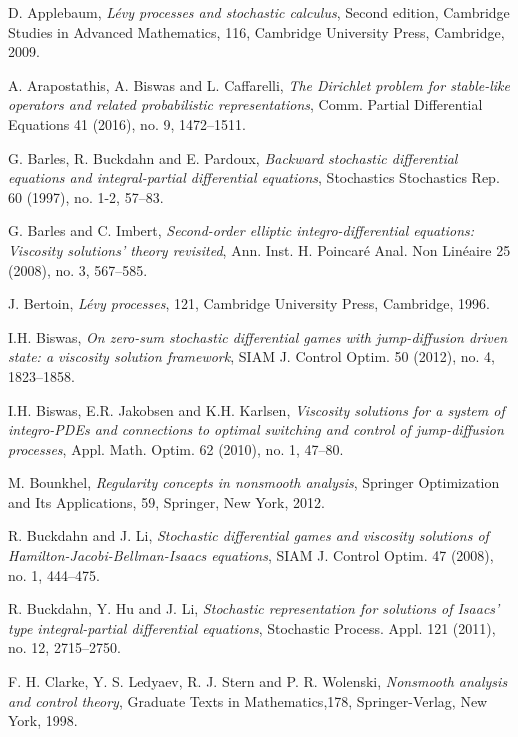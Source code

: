 \documentclass[amscd,amssymb,11pt]{article}
\numberwithin{theorem}{section}
\numberwithin{equation}{section}
\begin{document}
\begin{thebibliography}{99}

 D. Applebaum, {\it L\'evy processes and stochastic calculus}, Second edition,
Cambridge Studies in Advanced Mathematics, 116, Cambridge University Press, Cambridge, 2009.

A. Arapostathis, A. Biswas and L. Caffarelli, {\it The Dirichlet problem for stable-like operators and related probabilistic representations}, Comm. Partial Differential Equations 41 (2016), no. 9, 1472--1511.

 G. Barles, R. Buckdahn and E. Pardoux, {\it Backward stochastic differential equations and
integral-partial differential equations}, Stochastics Stochastics Rep. 60 (1997), no. 1-2, 57--83.

  G. Barles and C. Imbert, {\it Second-order elliptic integro-differential equations: Viscosity solutions'
theory revisited}, Ann. Inst. H. Poincar\'e Anal. Non Lin\'eaire 25 (2008), no. 3, 567--585.

 J. Bertoin, {\it L\'evy processes}, 121, Cambridge University Press, Cambridge, 1996.

 I.H. Biswas, {\it On zero-sum stochastic differential games with jump-diffusion driven state:
a viscosity solution framework}, SIAM J. Control Optim. 50 (2012), no. 4, 1823--1858.

 I.H. Biswas, E.R. Jakobsen and K.H. Karlsen,
{\it Viscosity solutions for a system of integro-PDEs and connections to optimal switching and control of jump-diffusion processes},
Appl. Math. Optim. 62 (2010), no. 1, 47--80.

 M. Bounkhel, {\it Regularity concepts in nonsmooth analysis}, Springer Optimization and Its Applications, 59, Springer, New York, 2012.

R. Buckdahn and J. Li,
{\it Stochastic differential games and viscosity solutions of Hamilton-Jacobi-Bellman-Isaacs equations},
SIAM J. Control Optim. 47 (2008), no. 1, 444--475.

 R. Buckdahn, Y. Hu and J. Li, {\it Stochastic representation for solutions of Isaacs' type
integral-partial differential equations}, Stochastic Process. Appl. 121 (2011), no. 12, 2715--2750.

F. H. Clarke, Y. S. Ledyaev, R. J. Stern and P. R. Wolenski, {\it Nonsmooth analysis and control theory},
Graduate Texts in Mathematics,178, Springer-Verlag, New York, 1998.


\end{thebibliography}
\end{document}
